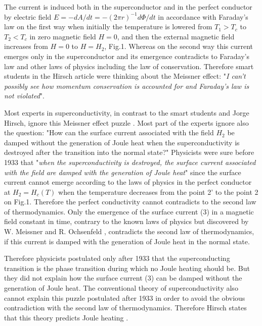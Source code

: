 \documentclass[twocolumn,secnumarabic,amssymb, nobibnotes, aps, prd]{revtex4}
\begin{document}
The current is induced both in the superconductor and in the perfect conductor by electric field $E = - dA/dt = -(2\pi r)^{-1}d\Phi /dt$ in accordance with Faraday's law on the first way when initially the temperature is lowered from $T_{1} > T_{c}$ to $T_{2} < T_{c}$ in zero magnetic field $H = 0$, and then the external magnetic field increases from $H = 0$ to $H = H_{2}$, Fig.1. Whereas on the second way this current emerges only in the superconductor and its emergence contradicts to Faraday's law and other laws of physics including the law of conservation. Therefore smart students  in the Hirsch article \cite{Hirsch2020APS} were thinking about the Meissner effect: "{\it I can't possibly see how momentum conservation is accounted for and Faraday's law is not violated}". 

Most experts in superconductivity, in contrast to the smart students and Jorge Hirsch, ignore this Meissner effect puzzle \cite{Hirsch10Meis}. Most part of the experts ignore also the question: "How can the surface current associated with the field $H_{2}$ be damped without the generation of Joule heat when the superconductivity is destroyed after the transition into the normal state?" Physicists were sure before 1933 that "{\it when the superconductivity is destroyed, the surface current associated with the field are damped with the generation of Joule heat}" \cite{Shoenberg1952} since the surface current cannot emerge according to the laws of physics in the perfect conductor at $H_{2} = H_{c}(T)$ when the temperature decreases from the point 2' to the point 2 on Fig.1. Therefore the perfect conductivity cannot contradicts to the second law of thermodynamics. Only the emergence of the surface current (3) in a magnetic field constant in time, contrary to the known laws of physics \cite{Hirsch10Meis} but discovered by  W. Meissner and R. Ochsenfeld \cite{Meissner1933}, contradicts the second law of thermodynamics, if this current is damped with the generation of Joule heat in the normal state. 

Therefore physicists postulated only after 1933 that the superconducting transition is the phase transition during which no Joule heating should be. But they did not explain how the surface current (3) can be damped without the generation of Joule heat. The conventional theory of superconductivity also cannot explain this puzzle postulated after 1933 in order to avoid the obvious contradiction with the second law of thermodynamics. Therefore Hirsch states that this theory predicts Joule heating \cite{Hirsch2020Physica,Hirsch2020EPL,Hirsch2020ModPhys}. 
\end{document}
